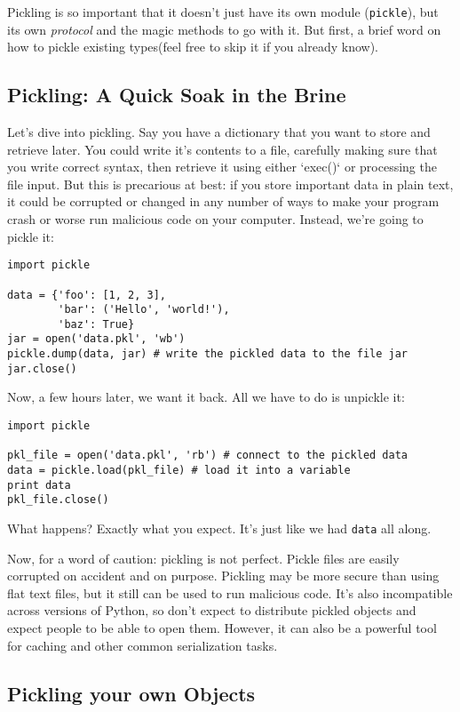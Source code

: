 \documentclass[a4paper,11pt]{article}
\newcommand{\code}[1]{\texttt{#1}}
\begin{document}
Pickling is so important that it doesn't just have its own module (\code{pickle}), but its own \emph{protocol} and the magic methods to go with it. But first, a brief word on how to pickle existing types(feel free to skip it if you already know).

\subsection{Pickling: A Quick Soak in the Brine}

Let's dive into pickling. Say you have a dictionary that you want to store and retrieve later. You could write it's contents to a file, carefully making sure that you write correct syntax, then retrieve it using either `exec()` or processing the file input. But this is precarious at best: if you store important data in plain text, it could be corrupted or changed in any number of ways to make your program crash or worse run malicious code on your computer. Instead, we're going to pickle it:

\begin{lstlisting}
import pickle

data = {'foo': [1, 2, 3],
        'bar': ('Hello', 'world!'),
        'baz': True}
jar = open('data.pkl', 'wb')
pickle.dump(data, jar) # write the pickled data to the file jar
jar.close()
\end{lstlisting}

\noindent
Now, a few hours later, we want it back. All we have to do is unpickle it:

\begin{lstlisting}
import pickle

pkl_file = open('data.pkl', 'rb') # connect to the pickled data
data = pickle.load(pkl_file) # load it into a variable
print data
pkl_file.close()
\end{lstlisting}

\noindent
What happens? Exactly what you expect. It's just like we had \code{data} all along.

Now, for a word of caution: pickling is not perfect. Pickle files are easily corrupted on accident and on purpose. Pickling may be more secure than using flat text files, but it still can be used to run malicious code. It's also incompatible across versions of Python, so don't expect to distribute pickled objects and expect people to be able to open them. However, it can also be a powerful tool for caching and other common serialization tasks.

\subsection{Pickling your own Objects}
\end{document}
